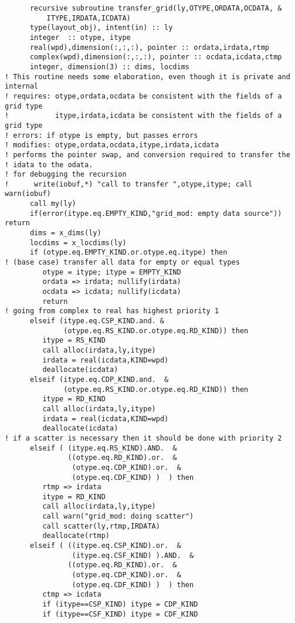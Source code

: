 \begin{verbatim}
      recursive subroutine transfer_grid(ly,OTYPE,ORDATA,OCDATA, &
          ITYPE,IRDATA,ICDATA)
      type(layout_obj), intent(in) :: ly
      integer  :: otype, itype
      real(wpd),dimension(:,:,:), pointer :: ordata,irdata,rtmp
      complex(wpd),dimension(:,:,:), pointer :: ocdata,icdata,ctmp
      integer, dimension(3) :: dims, locdims
! This routine needs some elaboration, even though it is private and internal
! requires: otype,ordata,ocdata be consistent with the fields of a grid type
!           itype,irdata,icdata be consistent with the fields of a grid type
! errors: if otype is empty, but passes errors
! modifies: otype,ordata,ocdata,itype,irdata,icdata
! performs the pointer swap, and conversion required to transfer the 
! idata to the odata.
! for debugging the recursion
!      write(iobuf,*) "call to transfer ",otype,itype; call warn(iobuf)
      call my(ly)
      if(error(itype.eq.EMPTY_KIND,"grid_mod: empty data source")) return 
      dims = x_dims(ly)
      locdims = x_locdims(ly)
      if (otype.eq.EMPTY_KIND.or.otype.eq.itype) then
! (base case) transfer all data for empty or equal types
         otype = itype; itype = EMPTY_KIND
         ordata => irdata; nullify(irdata)
         ocdata => icdata; nullify(icdata)
         return
! going from complex to real has highest priority 1
      elseif (itype.eq.CSP_KIND.and. &
              (otype.eq.RS_KIND.or.otype.eq.RD_KIND)) then
         itype = RS_KIND
         call alloc(irdata,ly,itype)
         irdata = real(icdata,KIND=wpd)
         deallocate(icdata)
      elseif (itype.eq.CDP_KIND.and.  &
              (otype.eq.RS_KIND.or.otype.eq.RD_KIND)) then
         itype = RD_KIND
         call alloc(irdata,ly,itype)
         irdata = real(icdata,KIND=wpd)
         deallocate(icdata)
! if a scatter is necessary then it should be done with priority 2
      elseif ( (itype.eq.RS_KIND).AND.  &
               ((otype.eq.RD_KIND).or.  &
                (otype.eq.CDP_KIND).or.  &
                (otype.eq.CDF_KIND) )  ) then
         rtmp => irdata
         itype = RD_KIND
         call alloc(irdata,ly,itype)
         call warn("grid_mod: doing scatter")
         call scatter(ly,rtmp,IRDATA)
         deallocate(rtmp)
      elseif ( ((itype.eq.CSP_KIND).or.  &
                (itype.eq.CSF_KIND) ).AND.  &
               ((otype.eq.RD_KIND).or.  &
                (otype.eq.CDP_KIND).or.  &
                (otype.eq.CDF_KIND) )  ) then
         ctmp => icdata
         if (itype==CSP_KIND) itype = CDP_KIND
         if (itype==CSF_KIND) itype = CDF_KIND

\end{verbatim}
